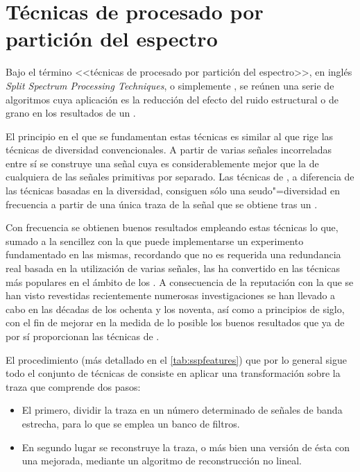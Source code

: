 \section{Técnicas de procesado por partición del espectro}

Bajo el término <<técnicas de procesado por partición del espectro>>, en inglés \emph{Split Spectrum Processing Techniques}, o simplemente , se reúnen una serie de algoritmos cuya aplicación es la reducción del efecto del ruido estructural o de grano en los resultados de un .\par
El principio en el que se fundamentan estas técnicas es similar al que rige las técnicas de diversidad convencionales. A partir de varias señales incorreladas entre sí se construye una señal cuya  es considerablemente mejor que la  de cualquiera de las señales primitivas por separado. Las técnicas de , a diferencia de las técnicas basadas en la diversidad, consiguen sólo una seudo"=diversidad en frecuencia a partir de una única traza de la señal que se obtiene tras un .\par
Con frecuencia se obtienen buenos resultados empleando estas técnicas lo que, sumado a la sencillez con la que puede implementarse un experimento fundamentado en las mismas, recordando que no es requerida una redundancia real basada en la utilización de varias señales, las ha convertido en las técnicas más populares en el ámbito de los . A consecuencia de la reputación con la que se han visto revestidas recientemente numerosas investigaciones se han llevado a cabo en las décadas de los ochenta y los noventa, así como a principios de siglo, con el fin de mejorar en la medida de lo posible los buenos resultados que ya de por sí proporcionan las técnicas de .\par
El procedimiento (más detallado en el \cref{tab:sspfeatures}) que por lo general sigue todo el conjunto de técnicas de  consiste en aplicar una transformación sobre la traza que comprende dos pasos:

\begin{itemize}
	\item El primero, dividir la traza en un número determinado de señales de banda estrecha, para lo que se emplea un banco de filtros.
	\item En segundo lugar se reconstruye la traza, o más bien una versión de ésta con una  mejorada, mediante un algoritmo de reconstrucción no lineal.
\end{itemize}

